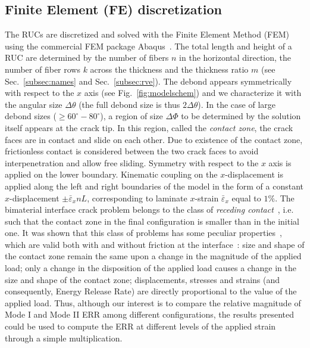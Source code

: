 \documentclass[Review,sagev,times]{sagej}
\begin{document}

\subsection{Finite Element (FE) discretization}

The RUCs are discretized and solved with the Finite Element Method (FEM) using the commercial FEM package Abaqus~\cite{abq12}. The total length and height of a RUC are determined by the number of fibers $n$ in the horizontal direction, the number of fiber rows $k$ across the thickness and the thickness ratio $m$ (see Sec.~\ref{subsec:names} and Sec.~\ref{subsec:rve}). The debond appears symmetrically with respect to the $x$ axis (see Fig.~\ref{fig:modelschem}) and we characterize it with the angular size $\Delta\theta$ (the full debond size is thus $2\Delta\theta$). In the case of large debond sizes ($\geq 60^{\circ}-80^{\circ}$), a region of size $\Delta\Phi$ to be determined by the solution itself appears at the crack tip. In this region, called the \emph{contact zone}, the crack faces are in contact and slide on each other. Due to existence of the contact zone, frictionless contact is considered between the two crack faces to avoid interpenetration and allow free sliding. Symmetry with respect to the $x$ axis is applied on the lower boundary. Kinematic coupling on the $x$-displacement is applied along the left and right boundaries of the model in the form of a constant $x$-displacement $\pm\bar{\varepsilon}_{x} nL$, corresponding to laminate $x$-strain $\bar{\varepsilon}_{x}$ equal to $1\%$. The bimaterial interface crack problem belongs to the class of \emph{receding contact}~\cite{Paris1996,Garrido1991}, i.e. such that the contact zone in the final configuration is smaller than in the initial one. It was shown that this class of problems has some peculiar properties~\cite{Keer1972,Tsai1974}, which are valid both with and without friction at the interface~\cite{Paris1996,Garrido1991}: size and shape of the contact zone remain the same upon a change in the magnitude of the applied load; only a change in the disposition of the applied load causes a change in the size and shape of the contact zone; displacements, stresses and strains (and consequently, Energy Release Rate) are directly proportional to the value of the applied load. Thus, although our interest is to compare the relative magnitude of Mode I and Mode II ERR among different configurations, the results presented could be used to compute the ERR at different levels of the applied strain through a simple multiplication.\\
\end{document}
